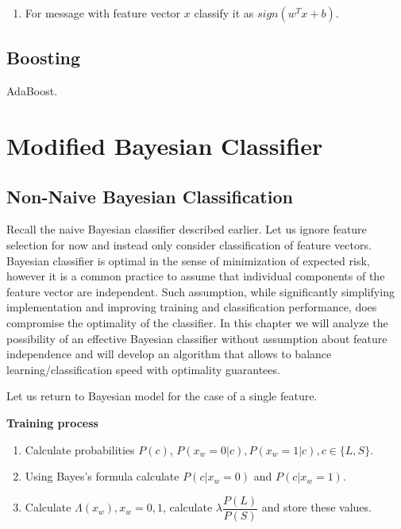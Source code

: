 \documentclass[12pt]{report}
\makeatletter
\renewcommand{\subsection}{\@startsection{subsection}{2}{0mm}{-\baselineskip}{-5pt}{\bf}}
\makeatother
\begin{document}
\begin{enumerate}
	\item For message with feature vector $x$ classify it as $sign(w^T x + b)$.
\end{enumerate}

\newpage

\section{Boosting}

AdaBoost.

\newpage


\chapter{Modified Bayesian Classifier}

\section{Non-Naive Bayesian Classification}

\subsection{Overview}

Recall the naive Bayesian classifier described earlier. Let us ignore feature selection for now and instead only consider classification of feature vectors. Bayesian classifier is optimal in the sense of minimization of expected risk, however it is a common practice to assume that individual components of the feature vector are independent. Such assumption, while significantly simplifying implementation and improving training and classification performance, does compromise the optimality of the classifier. In this chapter we will analyze the possibility of an effective Bayesian classifier without assumption about feature independence and will develop an algorithm that allows to balance learning/classification speed with optimality guarantees.

Let us return to Bayesian model for the case of a single feature.

\textbf{Training process}

\begin{enumerate}
	\item Calculate probabilities $P(c)$, $P(x_w = 0 | c), P(x_w = 1 | c), c \in \{L, S\}$.
	\item Using Bayes's formula calculate $P(c | x_w = 0)$ and $P(c | x_w = 1)$.
	\item Calculate $\Lambda(x_w), x_w = 0, 1$, calculate $\lambda \dfrac{P(L)}{P(S)}$ and store these values.
\end{enumerate}
\end{document}
